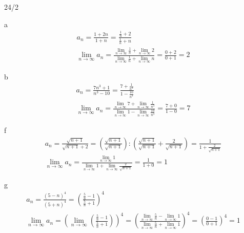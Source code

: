 \newpage
\begin{exercise}{24/2}
  \item [a]
  \begin{gather*}
    a_n = \frac{1 + 2n}{1 + n} = \frac{\frac{1}{n} + 2}{\frac{1}{n} + n} \\
    \lim\limits_{n \to \infty} a_n = \frac{\lim\limits_{n \to \infty} \frac{1}{n} + \lim\limits_{n \to \infty} 2}{\lim\limits_{n \to \infty} \frac{1}{n} + \lim\limits_{n \to \infty} n} = \frac{0 + 2}{0 + 1} = 2
  \end{gather*}
  \item [b]
  \begin{gather*}
    a_n = \frac{7n^3 + 1}{n^3 - 10} = \frac{7 + \frac{1}{n^3}}{1 - \frac{10}{n^3}} \\
    \lim\limits_{n \to \infty} a_n = \frac{\lim\limits_{n \to \infty} 7 + \lim\limits_{n \to \infty} \frac{1}{n^3}}{\lim\limits_{n \to \infty} 1 - \lim\limits_{n \to \infty} \frac{10}{n^3}} = \frac{7 + 0}{1 - 0} = 7
  \end{gather*}
  \item [f]
  \begin{gather*}
    a_n = \frac{\sqrt{n + 1}}{\sqrt{n + 1} + 2} = (\frac{\sqrt{n + 1}}{\sqrt{n + 1}}) : (\frac{\sqrt{n + 1}}{\sqrt{n + 1}} + \frac{2}{\sqrt{n + 1}}) = \frac{1}{1 + \frac{2}{\sqrt{n + 1}}} \\
    \lim\limits_{n \to \infty} a_n = \frac{\lim\limits_{n \to \infty} 1}{\lim\limits_{n \to \infty} 1 + \lim\limits_{n \to \infty} \frac{2}{\sqrt{n + 1}}} = \frac{1}{1 + 0} = 1
  \end{gather*}
  \item [g]
  \begin{gather*}
    a_n = \frac{(5 - n)^4}{(5 + n)^4} = (\frac{\frac{5}{n} - 1}{\frac{5}{n} + 1})^4 \\
    \lim\limits_{n \to \infty} a_n = (\lim\limits_{n \to \infty} (\frac{\frac{5}{n} - 1}{\frac{5}{n} + 1}))^4 = (\frac{\lim\limits_{n \to \infty} \frac{5}{n} - \lim\limits_{n \to \infty} 1}{\lim\limits_{n \to \infty} \frac{5}{n} + \lim\limits_{n \to \infty} 1})^4 = (\frac{0 - 1}{0 + 1})^4 = 1
  \end{gather*}
\end{exercise}
